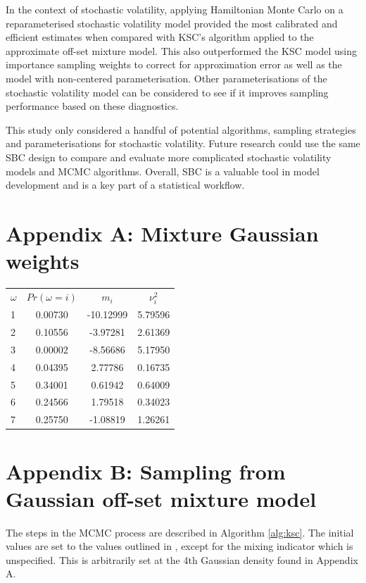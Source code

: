 \documentclass[12pt, a4paper]{article}
\begin{document}
In the context of stochastic volatility, applying Hamiltonian Monte Carlo on a reparameterised stochastic volatility model provided the most calibrated and efficient estimates when compared with KSC's algorithm applied to the approximate off-set mixture model. This also outperformed the KSC model using importance sampling weights to correct for approximation error as well as the model with non-centered parameterisation. Other parameterisations of the stochastic volatility model can be considered to see if it improves sampling performance based on these diagnostics. 

This study only considered a handful of potential algorithms, sampling strategies and parameterisations for stochastic volatility. Future research could use the same SBC design to compare and evaluate more complicated stochastic volatility models and MCMC algorithms. Overall, SBC is a valuable tool in model development and is a key part of a statistical workflow. 
 
\newpage



\newpage

\section{Appendix A: Mixture Gaussian weights}

\begin{table}[H]
    \centering
    \begin{tabular}{lccc} 
          $\omega$ &$Pr(\omega = i)$&  $m_i$&  $\nu^2_i$\\ 
          1&0.00730  &  -10.12999&  5.79596\\ 
          2&0.10556  &   -3.97281 &  2.61369\\ 
          3&0.00002 &  -8.56686 &   5.17950\\ 
          4&0.04395 &  2.77786  &   0.16735 \\ 
          5&0.34001&   0.61942    &  0.64009\\ 
          6&0.24566 &  1.79518    &  0.34023 \\ 
          7&0.25750 &  -1.08819    &  1.26261\\ 
    \end{tabular} 
\end{table}

\newpage

\section{Appendix B: Sampling from Gaussian off-set mixture model}
    The steps in the MCMC process are described in Algorithm \ref{alg:ksc}. The initial values are set to the values outlined in \citet{kim1998stochastic}, except for the mixing indicator which is unspecified. This is arbitrarily set at the 4th Gaussian density found in Appendix A. 
        
\end{document}
